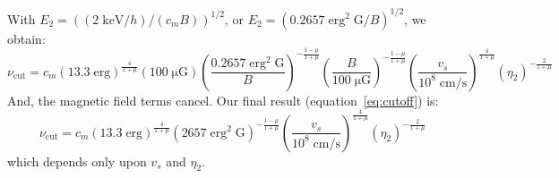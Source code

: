 \documentclass[manuscript]{aastex}  %
\newcommand*{\mt}{\mathrm}
\newcommand*{\unit}[1]{\;\mt{#1}}  %
\newcommand*{\muG}{\unit{\mu G}}
\begin{document}
With $E_2 = \left( (2 \unit{keV}/h) / (c_m B) \right)^{1/2}$, or
$E_2 = \left( 0.2657 \unit{erg^2\;G} / B \right)^{1/2}$, we obtain:
\[
    \nu_{\mt{cut}} = c_m
        \left( 13.3 \unit{erg} \right)^{\frac{4}{1+\mu}}
        \left( 100 \muG \right)
        \left( \frac{0.2657 \unit{erg^2\;G}}{B} \right)^{-\frac{1-\mu}{1+\mu}}
        \left( \frac{B}{100\muG} \right)^{-\frac{1-\mu}{1+\mu}}
        \left( \frac{v_s}{10^8 \unit{cm/s}} \right)^{\frac{4}{1+\mu}}
        \left( \eta_2 \right)^{-\frac{2}{1+\mu}}
\]
And, the magnetic field terms cancel.  Our final result
(equation~\eqref{eq:cutoff}) is:
\begin{equation}
    \nu_{\mt{cut}} = c_m
        \left( 13.3 \unit{erg} \right)^{\frac{4}{1+\mu}}
        \left( 2657 \unit{erg^2\;G} \right)^{-\frac{1-\mu}{1+\mu}}
        \left( \frac{v_s}{10^8 \unit{cm/s}} \right)^{\frac{4}{1+\mu}}
        \left( \eta_2 \right)^{-\frac{2}{1+\mu}}
\end{equation}
which depends only upon $v_s$ and $\eta_2$.

\end{document}

